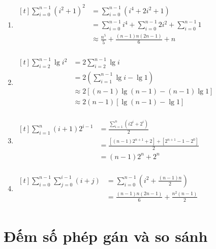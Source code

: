 \documentclass[12pt, letterpaper]{article}
\begin{document}
\begin{enumerate}
	\item $ \begin{aligned}[t]
			      \sum^{n - 1}_{i = 0} {(i^2 + 1)}^2
			       & = \sum^{n - 1}_{i = 0} (i^4 + 2i^2 + 1)                                         \\
			       & = \sum^{n - 1}_{i = 0} i^4 + \sum^{n - 1}_{i = 0} 2i^2 + \sum^{n - 1}_{i = 0} 1 \\
			       & \approx \frac{n^{5}}{5} + \frac{(n - 1)n(2n - 1)}{6} + n                        \\
		      \end{aligned} $

	\item $ \begin{aligned}[t]
			      \sum^{n - 1}_{i = 2} \lg{i^2}
			       & = 2 \sum^{n - 1}_{i = 2} \lg{i}                 \\
			       & = 2 (\sum^{n - 1}_{i = 1} \lg{i} - \lg{1})      \\
			       & \approx 2 [(n - 1)\lg{(n - 1)} - (n - 1)\lg{1}] \\
			       & \approx 2 (n - 1)[\lg{(n - 1)} - \lg{1}]        \\
		      \end{aligned} $

	\item $ \begin{aligned}[t]
			      \sum^{n}_{i = 1} (i + 1)2^{i - 1}
			       & = \frac{\sum^{n}_{i = 1} (i2^i + 2^i)}{2}                  \\
			       & = \frac{[(n - 1)2^{n + 1} + 2] + [2^{n + 1} - 1 - 2^0]}{2} \\
			       & = (n - 1)2^n + 2^n                                         \\
		      \end{aligned} $

	\item $ \begin{aligned}[t]
			      \sum^{n - 1}_{i = 0} \sum^{i - 1}_{j = 0} (i + j)
			       & = \sum^{n - 1}_{i = 0} (i^2 + \frac{(n - 1)n}{2})   \\
			       & = \frac{(n - 1)n(2n - 1)}{6} + \frac{n^2(n - 1)}{2} \\
		      \end{aligned} $
\end{enumerate}

\section{Đếm số phép gán và so sánh}
\end{document}
